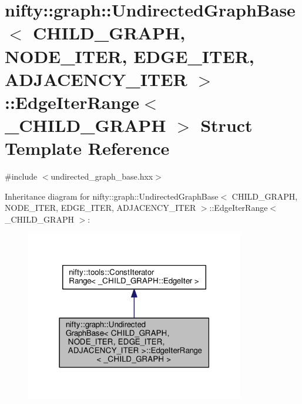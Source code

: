 \hypertarget{structnifty_1_1graph_1_1UndirectedGraphBase_1_1EdgeIterRange}{}\section{nifty\+:\+:graph\+:\+:Undirected\+Graph\+Base$<$ C\+H\+I\+L\+D\+\_\+\+G\+R\+A\+P\+H, N\+O\+D\+E\+\_\+\+I\+T\+E\+R, E\+D\+G\+E\+\_\+\+I\+T\+E\+R, A\+D\+J\+A\+C\+E\+N\+C\+Y\+\_\+\+I\+T\+E\+R $>$\+:\+:Edge\+Iter\+Range$<$ \+\_\+\+C\+H\+I\+L\+D\+\_\+\+G\+R\+A\+P\+H $>$ Struct Template Reference}
\label{structnifty_1_1graph_1_1UndirectedGraphBase_1_1EdgeIterRange}


{\ttfamily \#include $<$undirected\+\_\+graph\+\_\+base.\+hxx$>$}



Inheritance diagram for nifty\+:\+:graph\+:\+:Undirected\+Graph\+Base$<$ C\+H\+I\+L\+D\+\_\+\+G\+R\+A\+P\+H, N\+O\+D\+E\+\_\+\+I\+T\+E\+R, E\+D\+G\+E\+\_\+\+I\+T\+E\+R, A\+D\+J\+A\+C\+E\+N\+C\+Y\+\_\+\+I\+T\+E\+R $>$\+:\+:Edge\+Iter\+Range$<$ \+\_\+\+C\+H\+I\+L\+D\+\_\+\+G\+R\+A\+P\+H $>$\+:\nopagebreak
\begin{figure}[H]
\begin{center}
\leavevmode
\includegraphics[width=271pt]{structnifty_1_1graph_1_1UndirectedGraphBase_1_1EdgeIterRange__inherit__graph}
\end{center}
\end{figure}


